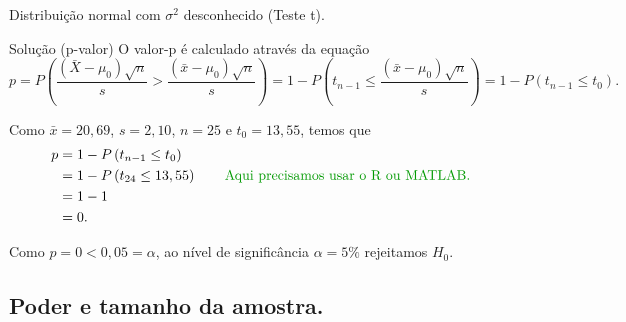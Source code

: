 \documentclass[8pt]{beamer}
\begin{document}
\begin{frame}{Distribuição normal com $\sigma^2$ desconhecido (Teste t).}

\normalsize

\begin{block}{Solução (p-valor)}
	O valor-p é calculado através da equação
	$$p = P\left( \frac{(\bar{X} - \mu_0)\sqrt{n}}{s} > \frac{(\bar{x} - \mu_0)\sqrt{n}}{s} \right) = 1 - P \left( t_{n-1} \leq \frac{(\bar{x} - \mu_0)\sqrt{n}}{s} \right)= 1- P(t_{n-1} \leq t_0).$$
	
	Como $\bar{x}=20,69$, $s=2,10$, $n=25$ e $t_0=13,55$, temos que
	\begin{align*}
		p &=1- P\left( t_{n-1} \leq t_0  \right)\\
		&=1- P \left( t_{24} \leq 13,55 \right)\qquad \mbox{\textcolor{important}{Aqui precisamos usar o R ou MATLAB.}}\\
		&=1 - 1\\
		&= 0.
	\end{align*}
	
	Como $p=0 < 0,05=\alpha$, ao nível de significância $\alpha=5\%$ rejeitamos $H_0$.
\end{block}

\normalsize
\end{frame}

\subsection{Poder e tamanho da amostra.}
\end{document}
